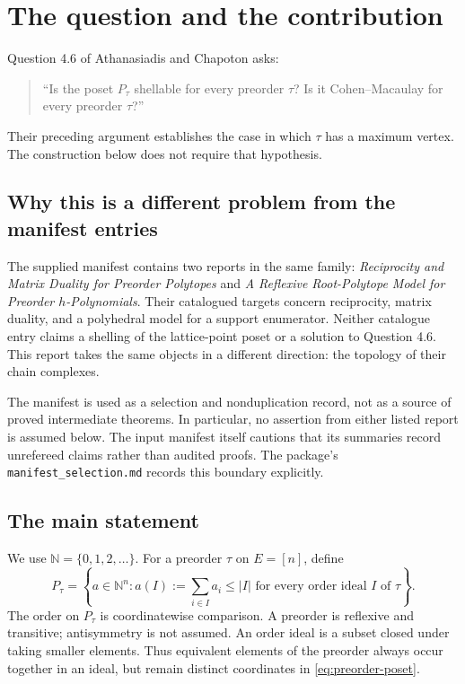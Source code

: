 \documentclass[11pt]{article}
\numberwithin{equation}{section}
\theoremstyle{definition}
\theoremstyle{remark}
\newcommand{\N}{\mathbb N}
\begin{document}
\clearpage
\begingroup
\small
\setlength{\parskip}{0pt}
\tableofcontents
\endgroup
\clearpage

\section{The question and the contribution}
\label{sec:introduction}

Question 4.6 of Athanasiadis and Chapoton \cite[p.~13]{AC} asks:
\begin{quote}
``Is the poset $P_\tau$ shellable for every preorder $\tau$? Is it
Cohen--Macaulay for every preorder $\tau$?''
\end{quote}
Their preceding argument establishes the case in which $\tau$ has a maximum
vertex. The construction below does not require that hypothesis.

\subsection{Why this is a different problem from the manifest entries}

The supplied manifest contains two reports in the same family:
\emph{Reciprocity and Matrix Duality for Preorder Polytopes} and
\emph{A Reflexive Root-Polytope Model for Preorder $h$-Polynomials}. Their
catalogued targets concern reciprocity, matrix duality, and a polyhedral model
for a support enumerator. Neither catalogue entry claims a shelling of the
lattice-point poset or a solution to Question 4.6. This report takes the same
objects in a different direction: the topology of their chain complexes.

The manifest is used as a selection and nonduplication record, not as a source
of proved intermediate theorems. In particular, no assertion from either
listed report is assumed below. The input manifest itself cautions that its
summaries record unrefereed claims rather than audited proofs. The package's
\texttt{manifest\_selection.md} records this boundary explicitly.

\subsection{The main statement}

We use $\N=\{0,1,2,\ldots\}$. For a preorder $\tau$ on $E=[n]$, define
\begin{equation}
 P_\tau=\left\{a\in\N^n:
 a(I):=\sum_{i\in I}a_i\le |I|
 \text{ for every order ideal }I\text{ of }\tau\right\}.
 \label{eq:preorder-poset}
\end{equation}
The order on $P_\tau$ is coordinatewise comparison. A preorder is reflexive
and transitive; antisymmetry is not assumed. An order ideal is a subset closed
under taking smaller elements. Thus equivalent elements of the preorder
always occur together in an ideal, but remain distinct coordinates in
\eqref{eq:preorder-poset}.
\end{document}
